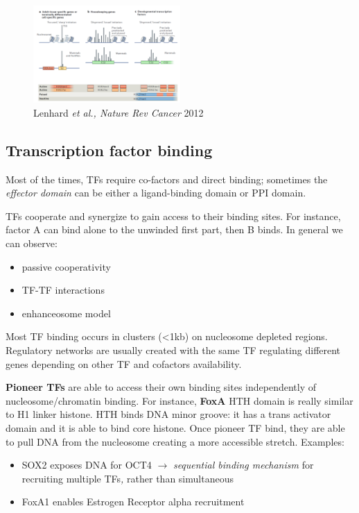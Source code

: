 \begin{figure}
\centering
\includegraphics[width=0.5\textwidth]{../_resources/Screenshot_2022-10-05_at_10-05-59.png}
\caption{Lenhard \emph{et al., Nature Rev Cancer} 2012}
\label{fig:types}
\end{figure}


\hypertarget{transcription-factor-binding}{%
\subsection{Transcription factor binding}\label{transcription-factor-binding}}

Most of the times, TFs require co-factors and direct binding; sometimes the \emph{effector domain} can be either a ligand-binding domain or PPI domain.

TFs cooperate and synergize to gain access to their binding sites. For instance, factor A can bind alone to the unwinded first part, then B binds. In general we can observe:

\begin{itemize}
\tightlist
\item
  passive cooperativity
\item
  TF-TF interactions
\item
  enhanceosome model
\end{itemize}

Most TF binding occurs in clusters (\textless1kb) on nucleosome depleted regions. Regulatory networks are usually created with the same TF regulating different genes depending on other TF and cofactors availability.

\textbf{Pioneer TFs} are able to access their own binding sites independently of nucleosome/chromatin binding. For instance, \textbf{FoxA} HTH domain is really similar to H1 linker histone. HTH binds DNA minor groove: it has a trans activator domain and it is able to bind core histone. Once pioneer TF bind, they are able to pull DNA from the nucleosome creating a more accessible stretch. Examples:

\begin{itemize}
\tightlist
\item
  SOX2 exposes DNA for OCT4 $\rightarrow$ \emph{sequential binding mechanism} for recruiting multiple TFs\emph{,} rather than simultaneous
\item
  FoxA1 enables Estrogen Receptor alpha recruitment
\end{itemize}

